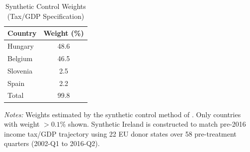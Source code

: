 \begin{table}[H]
\centering
\caption{Synthetic Control Weights (Tax/GDP Specification)}
\label{tab:weights}
\begin{threeparttable}
\begin{tabular}{lc}
\toprule
Country & Weight (\%) \\
\midrule
    Hungary & 48.6 \\
    Belgium & 46.5 \\
    Slovenia & 2.5 \\
    Spain & 2.2 \\
\midrule
    Total & 99.8 \\
\bottomrule
\end{tabular}
\begin{tablenotes}[flushleft]
\small
\item \textit{Notes:} Weights estimated by the synthetic control method of \citet{abadie2010synthetic}. Only countries with weight $> 0.1\%$ shown. Synthetic Ireland is constructed to match pre-2016 income tax/GDP trajectory using 22 EU donor states over 58 pre-treatment quarters (2002-Q1 to 2016-Q2).
\end{tablenotes}
\end{threeparttable}
\end{table}
